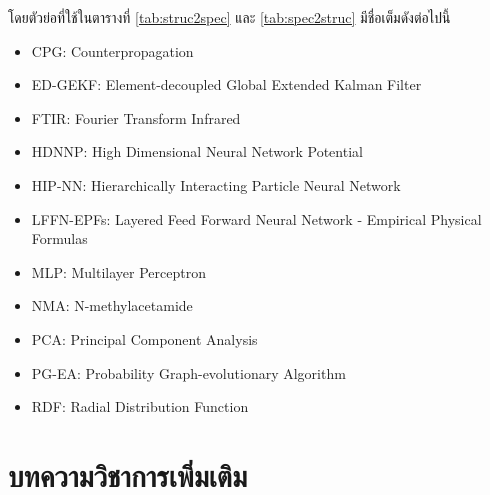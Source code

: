 \noindent โดยตัวย่อที่ใช้ในตารางที่ \ref{tab:struc2spec} และ \ref{tab:spec2struc} มีชื่อเต็มดังต่อไปนี้
%
\begin{itemize}[topsep=0pt,noitemsep]\setlength\itemsep{0.5em}
    \item CPG: Counterpropagation

    \item ED-GEKF: Element-decoupled Global Extended Kalman Filter

    \item FTIR: Fourier Transform Infrared

    \item HDNNP: High Dimensional Neural Network Potential

    \item HIP-NN: Hierarchically Interacting Particle Neural Network

    \item LFFN-EPFs: Layered Feed Forward Neural Network - Empirical Physical Formulas

    \item MLP: Multilayer Perceptron

    \item NMA: N-methylacetamide

    \item PCA: Principal Component Analysis

    \item PG-EA: Probability Graph-evolutionary Algorithm

    \item RDF: Radial Distribution Function
\end{itemize}


\section{บทความวิชาการเพิ่มเติม}
\label{sec:pred_misc_papers}

